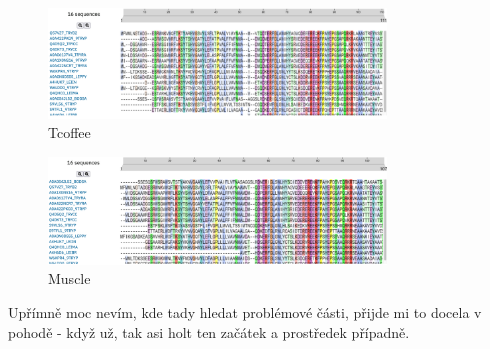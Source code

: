 \documentclass{article}
\begin{document}
\begin{figure}[H]
    \centering
    \includegraphics[width=0.8\textwidth]{tcoffee.png}
    \caption{Tcoffee}
\end{figure}

\begin{figure}[H]
    \centering
    \includegraphics[width=0.8\textwidth]{muscle.png}
    \caption{Muscle}
\end{figure}

Upřímně moc nevím, kde tady hledat problémové části, přijde mi to docela v pohodě - když už, tak asi holt ten začátek a prostředek případně.
\end{document}
